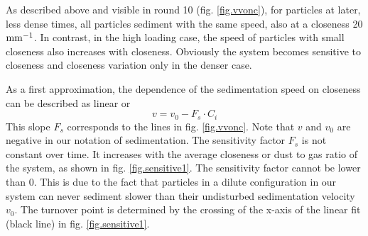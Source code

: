 As described above and visible in round 10 (fig. \ref{fig.vvonc}), for particles at later, less dense times,
all particles sediment with the same speed, also at a closeness 20 $\rm mm^{-1}$.
In contrast, in the high loading case, the speed of particles with small closeness also 
increases with closeness. Obviously the system becomes sensitive to closeness and closeness variation only 
in the denser case.

As a first approximation, the dependence of the sedimentation speed on closeness can be described as linear or
\begin{equation}
\label{eq.vcloseness}
v = v_0 - F_s \cdot C_i
\end{equation}
{This slope $F_s$ corresponds to the lines in fig. \ref{fig.vvonc}}.
Note that $v$ and $v_0$ are negative in our notation of sedimentation.
{The sensitivity factor $F_s$ is not constant over time.} It increases with the average closeness or dust to gas ratio of the system, as shown in fig. \ref{fig.sensitive1}.
{The sensitivity factor cannot be lower than 0. This is due to the fact that particles in a dilute configuration in our system can never sediment slower than their undisturbed sedimentation velocity $v_0$. The turnover point is determined by the crossing of the x-axis of the linear fit (black line) in fig. \ref{fig.sensitive1}.}



